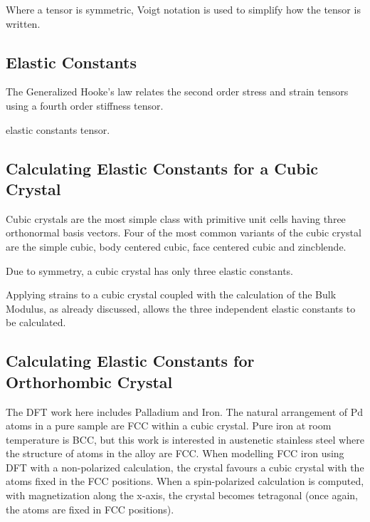 Where a tensor is symmetric, Voigt notation is used to simplify how the tensor is written.

\voigtexample



\subsection{Elastic Constants}

The Generalized Hooke's law relates the second order stress and strain tensors using a fourth order stiffness tensor.


\eqStiffnessTensor

\eqStrainTensorVoight

elastic constants tensor.  


\subsection{Calculating Elastic Constants for a Cubic Crystal}


Cubic crystals are the most simple class with primitive unit cells having three orthonormal basis vectors.  Four of the most common variants of the cubic crystal are the simple cubic, body centered cubic, face centered cubic and zincblende.

Due to symmetry, a cubic crystal has only three elastic constants.

Applying strains to a cubic crystal \cite{pressuredepmehl} coupled with the calculation of the Bulk Modulus, as already discussed, allows the three independent elastic constants to be calculated.


\eqMehlStrainA

\eqMehlStrainB



\subsection{Calculating Elastic Constants for Orthorhombic Crystal}


The DFT work here includes Palladium and Iron.  The natural arrangement of Pd atoms in a pure sample are FCC within a cubic crystal.  Pure iron at room temperature is BCC, but this work is interested in austenetic stainless steel where the structure of atoms in the alloy are FCC.  When modelling FCC iron using DFT with a non-polarized calculation, the crystal favours a cubic crystal with the atoms fixed in the FCC positions.  When a spin-polarized calculation is computed, with magnetization along the x-axis, the crystal becomes tetragonal (once again, the atoms are fixed in FCC positions).


